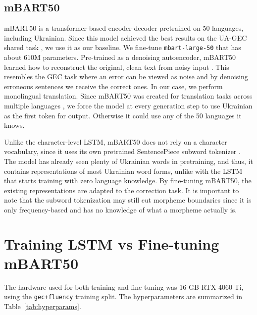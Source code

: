 \documentclass[11pt]{article}
\begin{document}
\subsection{mBART50}
mBART50 is a transformer-based encoder-decoder pretrained on 50 languages, including Ukrainian. Since this model achieved the best results on the UA-GEC shared task \citep{syvokon-romanyshyn-2023-unlp}, we use it as our baseline. We fine-tune \texttt{mbart-large-50} that has about 610M parameters. Pre-trained as a denoising autoencoder, mBART50 learned how to reconstruct the original, clean text from noisy input \citep{tang-etal-2021-multilingual}. This resembles the GEC task where an error can be viewed as noise and by denoising erroneous sentences we receive the correct ones. In our case, we perform monolingual translation. Since mBART50 was created for translation tasks across multiple languages \citep{tang-etal-2021-multilingual}, we force the model at every generation step to use Ukrainian as the first token for output. Otherwise it could use any of the 50 languages it knows.

 
Unlike the character-level LSTM, mBART50 does not rely on a character vocabulary, since it uses its own pretrained SentencePiece subword tokenizer \citep{kudo-richardson-2018-sentencepiece}. The model has already seen plenty of Ukrainian words in pretraining, and thus, it contains representations of most Ukrainian word forms, unlike with the LSTM that starts training with zero language knowledge. By fine-tuning mBART50, the existing representations are adapted to the correction task. It is important to note that the subword tokenization may still cut morpheme boundaries since it is only frequency-based and has no knowledge of what a morpheme actually is. 


 

\section{Training LSTM vs Fine-tuning mBART50}

The hardware used for both training and fine-tuning was 16 GB RTX 4060 Ti, using
the \texttt{gec+fluency} training split. The hyperparameters are summarized in Table~\ref{tab:hyperparams}.
\end{document}
